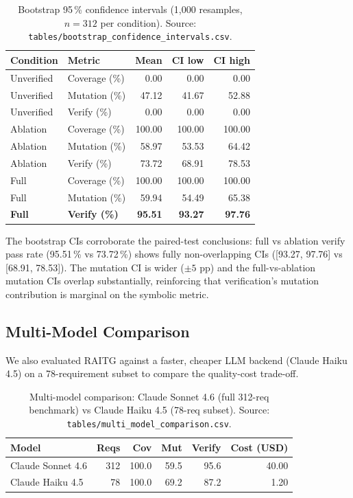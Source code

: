 \documentclass[10pt,twocolumn,letterpaper]{article}
\begin{document}
\begin{table}[H]
\centering
\caption{Bootstrap 95\,\% confidence intervals (1{,}000 resamples,
$n = 312$ per condition).
Source: \texttt{tables/bootstrap\_confidence\_intervals.csv}.}
\label{tab:bootstrap}
\small
\begin{tabular}{llrrr}
\toprule
Condition   & Metric        & Mean   & CI low & CI high \\
\midrule
Unverified  & Coverage (\%) & 0.00   & 0.00   & 0.00 \\
Unverified  & Mutation (\%) & 47.12  & 41.67  & 52.88 \\
Unverified  & Verify (\%)   & 0.00   & 0.00   & 0.00 \\
Ablation    & Coverage (\%) & 100.00 & 100.00 & 100.00 \\
Ablation    & Mutation (\%) & 58.97  & 53.53  & 64.42 \\
Ablation    & Verify (\%)   & 73.72  & 68.91  & 78.53 \\
Full        & Coverage (\%) & 100.00 & 100.00 & 100.00 \\
Full        & Mutation (\%) & 59.94  & 54.49  & 65.38 \\
\textbf{Full} & \textbf{Verify (\%)} & \textbf{95.51} & \textbf{93.27} & \textbf{97.76} \\
\bottomrule
\end{tabular}
\end{table}

The bootstrap CIs corroborate the paired-test conclusions: full vs
ablation verify pass rate (95.51\,\% vs 73.72\,\%) shows fully
non-overlapping CIs ([93.27, 97.76] vs [68.91, 78.53]). The mutation
CI is wider ($\pm 5$ pp) and the full-vs-ablation mutation CIs overlap
substantially, reinforcing that verification's mutation contribution
is marginal on the symbolic metric.

\subsection{Multi-Model Comparison}
\label{sec:multimodel}

We also evaluated RAITG against a faster, cheaper LLM backend
(Claude Haiku 4.5) on a 78-requirement subset to compare the
quality-cost trade-off.

\begin{table}[H]
\centering
\caption{Multi-model comparison: Claude Sonnet 4.6 (full 312-req
benchmark) vs Claude Haiku 4.5 (78-req subset).
Source: \texttt{tables/multi\_model\_comparison.csv}.}
\label{tab:multimodel}
\small
\begin{tabular}{lrrrrr}
\toprule
Model & Reqs & Cov & Mut & Verify & Cost (USD) \\
\midrule
Claude Sonnet 4.6 & 312 & 100.0 & 59.5 & 95.6 & 40.00 \\
Claude Haiku 4.5  &  78 & 100.0 & 69.2 & 87.2 &  1.20 \\
\bottomrule
\end{tabular}
\end{table}
\end{document}
